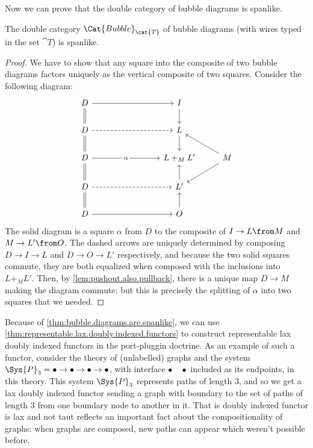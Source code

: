 \documentclass[DynamicalBook]{subfiles}
\begin{document}
    Now we can prove that the double category of bubble diagrams is spanlike.
\begin{theorem}\label{thm:bubble.diagrams.are.spanlike}
The double category $\Cat{Bubble}_{\cat{T}}$ of bubble diagrams (with wires typed in the set $\cat{T}$) is spanlike.
  \end{theorem}
  \begin{proof}
    We have to show that any square into the composite of two bubble diagrams factors uniquely as the vertical composite of two squares. Consider the following diagram:
    \[
\begin{tikzcd}
	D &&& I \\
	D && {} & L \\
	D &&& {L +_M L'} & M \\
	D &&& {L'} \\
	D &&& O
	\arrow[from=1-1, to=2-1, equals]
	\arrow[from=2-1, to=3-1, equals]
	\arrow[from=3-1, to=4-1, equals]
	\arrow[from=4-1, to=5-1, equals]
	\arrow[from=1-1, to=1-4]
	\arrow[from=5-1, to=5-4]
	\arrow[from=1-4, to=2-4]
	\arrow[from=3-5, to=2-4]
	\arrow[from=3-5, to=4-4]
	\arrow[from=5-4, to=4-4]
	\arrow[from=2-4, to=3-4]
	\arrow[from=4-4, to=3-4]
	\arrow["\alpha"{description}, from=3-1, to=3-4]
	\arrow[dashed, from=2-1, to=2-4]
	\arrow[dashed, from=4-1, to=4-4]
\end{tikzcd}
    \]
    The solid diagram is a square $\alpha$ from $D$ to the composite of $I \to L \from M$ and $M \to L' \from O$. The dashed arrows are uniquely determined by composing $D \to I \to L$ and $D \to O \to L'$ respectively, and because the two solid squares commute, they are both equalized when composed with the inclusions into $L +_{M} L'$. Then, by \cref{lem:pushout.also.pullback}, there is a unique map $D \to M$ making the diagram commute; but this is precisely the splitting of $\alpha$ into two squares that we needed.
  \end{proof}

Because of \cref{thm:bubble.diagrams.are.spanlike}, we can use \cref{thm:representable.lax.doubly.indexed.functors} to construct representable lax doubly indexed functors in the port-pluggin doctrine. As an example of such a functor, consider the theory of (unlabelled) graphs and the system $\Sys{P}_{3} = \bullet \to \bullet \to \bullet \to \bullet$, with interface $\bullet \quad \bullet$ included as its endpoints, in this theory. This system $\Sys{P}_{3}$ represents paths of length $3$, and so we get a lax doubly indexed functor sending a graph with boundary to the set of paths of length $3$ from one boundary node to another in it. That is doubly indexed functor is lax and not taut reflects an important fact about the compositionality of graphs: when graphs are composed, new paths can appear which weren't possible before.
\end{document}
